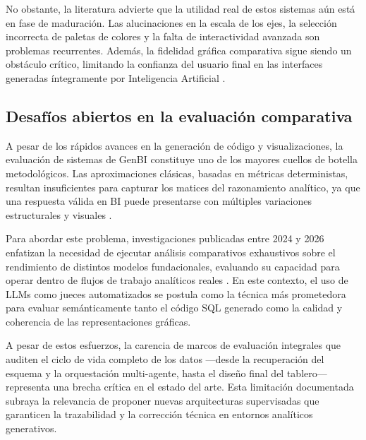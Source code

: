 No obstante, la literatura advierte que la utilidad real de estos sistemas
aún está en fase de maduración. Las alucinaciones en la escala de los ejes,
la selección incorrecta de paletas de colores y la falta de interactividad
avanzada son problemas recurrentes. Además, la fidelidad gráfica comparativa
sigue siendo un obstáculo crítico, limitando la confianza del usuario final
en las interfaces generadas íntegramente por Inteligencia Artificial
\citep{perez2026ia}.

\subsection{Desafíos abiertos en la evaluación comparativa}

A pesar de los rápidos avances en la generación de código y visualizaciones,
la evaluación de sistemas de GenBI
constituye uno de los mayores cuellos de botella metodológicos. Las
aproximaciones clásicas, basadas en métricas deterministas, resultan
insuficientes para capturar los matices del razonamiento analítico, ya que
una respuesta válida en BI puede presentarse con múltiples variaciones
estructurales y visuales \citep{perez2026ia}.

Para abordar este problema, investigaciones publicadas entre 2024 y 2026
enfatizan la necesidad de ejecutar análisis comparativos exhaustivos sobre
el rendimiento de distintos modelos fundacionales, evaluando su capacidad
para operar dentro de flujos de trabajo analíticos reales \citep{Jaisinghani2024}.
En este contexto, el uso de LLMs como jueces automatizados se postula
como la técnica más prometedora para evaluar semánticamente tanto el código
SQL generado como la calidad y coherencia de las representaciones gráficas.

A pesar de estos esfuerzos, la carencia de marcos de evaluación integrales
que auditen el ciclo de vida completo de los datos —desde la recuperación
del esquema y la orquestación multi-agente, hasta el diseño final del
tablero— representa una brecha crítica en el estado del arte. Esta limitación
documentada subraya la relevancia de proponer nuevas arquitecturas
supervisadas que garanticen la trazabilidad y la corrección técnica en
entornos analíticos generativos.